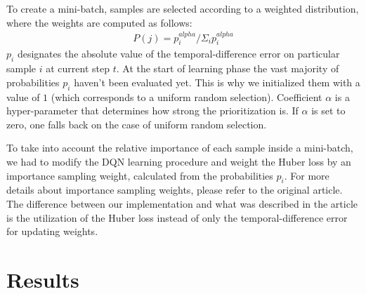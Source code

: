 \documentclass[letterpaper]{article}
\begin{document}
To create a mini-batch, samples are selected according to a weighted distribution, where the weights are computed as follows:
\begin{multline}
    P(j) = p_i^{alpha} / \Sigma_i p_i^{alpha}
\end{multline}
$p_i$ designates the absolute value of the temporal-difference error on particular sample $i$ at current step $t$.
At the start of learning phase the vast majority of probabilities $p_i$ haven't been evaluated yet. This is why we initialized
them with a value of $1$ (which corresponds to a uniform random selection). Coefficient $\alpha$ is a hyper-parameter that
determines how strong the prioritization is. If $\alpha$ is set to zero, one falls back on the case of uniform random selection.

To take into account the relative importance of each sample inside a mini-batch, we had to modify the DQN learning procedure and weight the Huber loss
by an importance sampling weight, calculated from the probabilities $p_i$. For more details about importance sampling weights, please refer to the original
article. The difference between our implementation and what was described in the article is the utilization of the Huber loss instead of only
the temporal-difference error for updating weights.

\section{Results}
\end{document}

